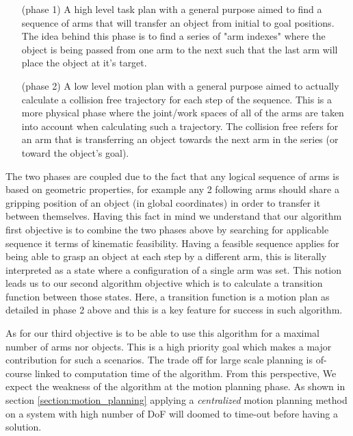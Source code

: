\begin{enumerate}
\item[(phase 1)] A high level task plan with a general purpose aimed to find a sequence of arms that will transfer an object from initial to goal positions. 
The idea behind this phase is to find a series of "arm indexes" where the object is being passed from one arm to the next such that the last arm will place the object at it's target.


\item[(phase 2)] A low level motion plan with a general purpose aimed to actually calculate a collision free trajectory for each step of the sequence. This is a more physical phase where the joint/work spaces of all of the arms are taken into account when calculating such a trajectory. The collision free refers for an arm that is transferring an object towards the next arm in the series (or toward the object's goal).

\end{enumerate}

The two phases are coupled due to the fact that any logical sequence of arms is based on geometric properties, for example any 2 following arms should share a gripping position of an object (in global coordinates) in order to transfer it between themselves. Having this fact in mind we understand that our algorithm first objective is to combine the two phases above by searching for applicable sequence it terms of kinematic feasibility. 
Having a feasible sequence applies for being able to grasp an object at each step by a different arm, this is literally interpreted as a state where a configuration of a single arm was set. This notion leads us to our second algorithm objective which is to calculate a transition function between those states. Here, a transition function is a motion plan as detailed in phase 2 above and this is a key feature for success in such algorithm.


As for our third objective is to be able to use this algorithm for a maximal number of arms nor objects. This is a high priority goal which makes a major contribution for such a scenarios. The trade off for large scale planning is of-course linked to computation time of the algorithm. From this perspective, We expect the weakness of the algorithm at the motion planning phase. As shown in section \ref{section:motion_planning} applying a \textit{centralized} motion planning method on a system with high number of DoF will doomed to time-out before having a solution.  


